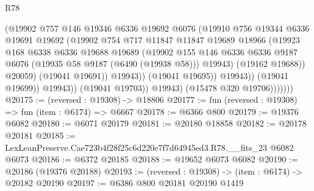 \begin{lexlean}{R78}
\begin{coremodule}
                                  (@19902
                                    @757
                                    @146
                                    @19346
                                    @6336
                                    @19692
                                    @6076
                                    (@19910
                                      @756
                                      @19344
                                      @6336
                                      @19691
                                      @19692
                                      (@19902
                                        @754
                                        @717
                                        @11847
                                        @11847
                                        @19689
                                        @18966
                                        (@19923
                                          @168
                                          @6338
                                          @6336
                                          @19688
                                          @19689
                                          (@19902
                                            @155
                                            @146
                                            @6336
                                            @6336
                                            @9187
                                            @6076
                                            (@19935 @58 @9187 (@6490 (@19938 @58)))
                                            @19943)
                                          (@19162 @19688))
                                        @20059)
                                      (@19041 @19691))
                                    @19943))
                                (@19041 @19695))
                              @19943))
                          (@19041 @19699))
                        @19943))
                    (@19041 @19703))
                  @19943)
                (@15478 @320 @19706)))))))
@20175 := (reversed : @19308) -> @18806
@20177 := fun (reversed : @19308) => fun (item : @6174) => @6667
@20178 := @6366 @800
@20179 := @19376 @6082
@20180 := @6071 @20179
@20181 := @20180 @18858
@20182 := @20178 @20181
@20185 := LexLeanPreserve.Cae723b4f28f25c6d220e7f7d64945ed3.R78.__fits_23 @6082 @6073
@20186 := @6372 @20185
@20188 := @19652 @6073 @6082
@20190 := @20186 (@19376 @20188)
@20193 := (reversed : @19308) -> (item : @6174) -> @20182 @20190
@20197 := @6386 @800 @20181 @20190 @1419

\end{coremodule}
\end{lexlean}
